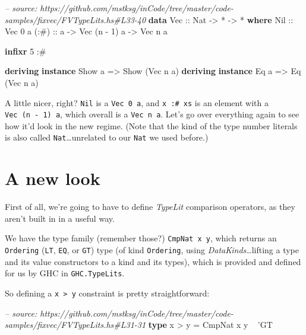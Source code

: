 \documentclass[]{article}
\newenvironment{Shaded}{}{}
\newcommand{\KeywordTok}[1]{\textcolor[rgb]{0.00,0.44,0.13}{\textbf{#1}}}
\newcommand{\DataTypeTok}[1]{\textcolor[rgb]{0.56,0.13,0.00}{#1}}
\newcommand{\DecValTok}[1]{\textcolor[rgb]{0.25,0.63,0.44}{#1}}
\newcommand{\CharTok}[1]{\textcolor[rgb]{0.25,0.44,0.63}{#1}}
\newcommand{\CommentTok}[1]{\textcolor[rgb]{0.38,0.63,0.69}{\textit{#1}}}
\newcommand{\OtherTok}[1]{\textcolor[rgb]{0.00,0.44,0.13}{#1}}
\newcommand{\FunctionTok}[1]{\textcolor[rgb]{0.02,0.16,0.49}{#1}}
\newcommand{\NormalTok}[1]{#1}
\begin{document}
\begin{Shaded}
\begin{Highlighting}[]
\CommentTok{-- source: https://github.com/mstksg/inCode/tree/master/code-samples/fixvec/FVTypeLits.hs#L33-40}
\KeywordTok{data} \DataTypeTok{Vec}\OtherTok{ ::} \DataTypeTok{Nat} \OtherTok{->} \FunctionTok{*} \OtherTok{->} \FunctionTok{*} \KeywordTok{where}
    \DataTypeTok{Nil}\OtherTok{  ::} \DataTypeTok{Vec} \DecValTok{0}\NormalTok{ a}
\OtherTok{    (:#) ::}\NormalTok{ a }\OtherTok{->} \DataTypeTok{Vec}\NormalTok{ (n }\FunctionTok{-} \DecValTok{1}\NormalTok{) a }\OtherTok{->} \DataTypeTok{Vec}\NormalTok{ n a}

\KeywordTok{infixr} \DecValTok{5} \FunctionTok{:#}

\KeywordTok{deriving} \KeywordTok{instance} \DataTypeTok{Show}\NormalTok{ a }\OtherTok{=>} \DataTypeTok{Show}\NormalTok{ (}\DataTypeTok{Vec}\NormalTok{ n a)}
\KeywordTok{deriving} \KeywordTok{instance} \DataTypeTok{Eq}\NormalTok{ a }\OtherTok{=>} \DataTypeTok{Eq}\NormalTok{ (}\DataTypeTok{Vec}\NormalTok{ n a)}
\end{Highlighting}
\end{Shaded}

A little nicer, right? \texttt{Nil} is a \texttt{Vec\ 0\ a}, and
\texttt{x\ :\#\ xs} is an element with a \texttt{Vec\ (n\ -\ 1)\ a}, which
overall is a \texttt{Vec\ n\ a}. Let's go over everything again to see how it'd
look in the new regime. (Note that the kind of the type number literals is also
called \texttt{Nat}\ldots{}unrelated to our \texttt{Nat} we used before.)

\section{A new look}\label{a-new-look}

First of all, we're going to have to define \emph{TypeLit} comparison operators,
as they aren't built in in a useful way.

We have the type family (remember those?) \texttt{CmpNat\ x\ y}, which returns
an \texttt{Ordering} (\texttt{LT}, \texttt{EQ}, or \texttt{GT}) type (of kind
\texttt{Ordering}, using \emph{DataKinds}\ldots{}lifting a type and its value
constructors to a kind and its types), which is provided and defined for us by
GHC in \texttt{GHC.TypeLits}.

So defining a \texttt{x\ \textgreater{}\ y} constraint is pretty
straightforward:

\begin{Shaded}
\begin{Highlighting}[]
\CommentTok{-- source: https://github.com/mstksg/inCode/tree/master/code-samples/fixvec/FVTypeLits.hs#L31-31}
\KeywordTok{type}\NormalTok{ x }\FunctionTok{>}\NormalTok{ y }\FunctionTok{=} \DataTypeTok{CmpNat}\NormalTok{ x y }\FunctionTok{~} \CharTok{'GT}
\end{Highlighting}
\end{Shaded}
\end{document}
